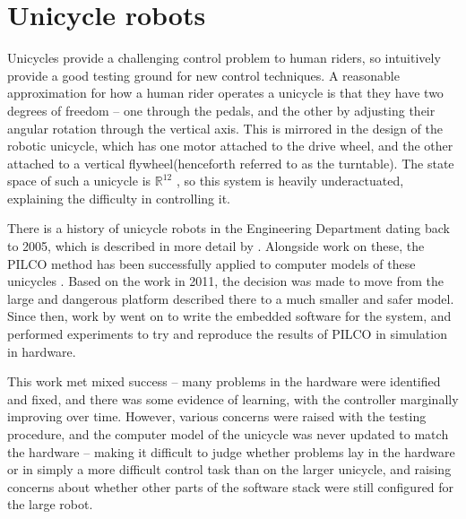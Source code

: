 \documentclass[main.tex]{subfiles}
\begin{document}



\section{Unicycle robots}

	Unicycles provide a challenging control problem to human riders, so intuitively provide a good testing ground for new control techniques.
	A reasonable approximation for how a human rider operates a unicycle is that they have two degrees of freedom -- one through the pedals, and the other by adjusting their angular rotation through the vertical axis.
	This is mirrored in the design of the robotic unicycle, which has one motor attached to the drive wheel, and the other attached to a vertical flywheel\footnotemark (henceforth referred to as the turntable).
	The state space of such a unicycle is $\mathbb{R}^{12}$ \cite{forster}, so this system is heavily underactuated, explaining the difficulty in controlling it.



	There is a history of unicycle robots in the Engineering Department dating back to 2005, which is described in more detail by \citeauthor{quiero} \cite{quiero}.
	Alongside work on these, the PILCO method has been successfully applied to computer models of these unicycles  \cite[section~3.3]{pilco}.
	Based on the work in 2011, the decision was made to move from the large and dangerous platform described there to a much smaller and safer model.
	Since then, work by \citeauthor{aleksi} \cite{aleksi} went on to write the embedded software for the system, and performed experiments to try and reproduce the results of PILCO in simulation in hardware.

	This work met mixed success -- many problems in the hardware were identified and fixed, and there was some evidence of learning, with the controller marginally improving over time.
	However, various concerns were raised with the testing procedure, and the computer model of the unicycle was never updated to match the hardware -- making it difficult to judge whether problems lay in the hardware or in simply a more difficult control task than on the larger unicycle, and raising concerns about whether other parts of the software stack were still configured for the large robot.
\end{document}
